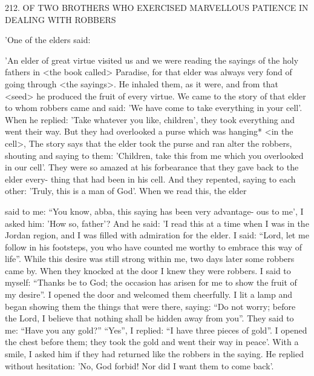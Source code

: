 212. OF TWO BROTHERS WHO EXERCISED
MARVELLOUS PATIENCE IN DEALING WITH ROBBERS

'One of the elders said:

'An elder of great virtue visited us and we were reading the sayings
of the holy fathers in <the book called> Paradise, for that elder was
always very fond of going through <the sayings>. He inhaled them,
as it were, and from that <seed> he produced the fruit of every
virtue. We came to the story of that elder to whom robbers came
and said: 'We have come to take everything in your cell'. When he
replied: 'Take whatever you like, children', they took everything and
went their way. But they had overlooked a purse which was
hanging* <in the cell>, The story says that the elder took the purse
and ran alter the robbers, shouting and saying to them: 'Children,
take this from me which you overlooked in our cell'. They were so
amazed at his forbearance that they gave back to the elder every-
thing that had been in his cell. And they repented, saying to each
other: 'Truly, this is a man of God'. When we read this, the elder

said to me: “You know, abba, this saying has been very advantage-
ous to me', I asked him: 'How so, father'? And he said: 'I read this
at a time when I was in the Jordan region, and I was filled with
admiration for the elder. I said: “Lord, let me follow in his
footsteps, you who have counted me worthy to embrace this way of
life”. While this desire was still strong within me, two days later
some robbers came by. When they knocked at the door I knew they
were robbers. I said to myself: “Thanks be to God; the occasion has
arisen for me to show the fruit of my desire”. I opened the door and
welcomed them cheerfully. I lit a lamp and began showing them the
things that were there, saying: “Do not worry; before the Lord, I
believe that nothing shall be hidden away from you”. They said to
me: “Have you any gold?” “Yes”, I replied: “I have three pieces of
gold”. I opened the chest before them; they took the gold and went
their way in peace'. With a smile, I asked him if they had returned
like the robbers in the saying. He replied without hesitation: 'No,
God forbid! Nor did I want them to come back'.

